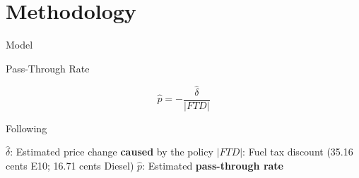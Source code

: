 \section{Methodology}






\begin{frame}{Model}


\vspace{-0.7cm}



\begin{block}{Pass-Through Rate}

\begin{equation}
\label{eq:Pass_Through_Rate}
\hat{p} = - \frac{\hat{\delta}}{|FTD|} 
\end{equation}

\begin{tiny}
Following \textcite{Frondel2024}    
\end{tiny}

\end{block}





\vspace{0.4cm}

\begin{outline}
    \1 $\hat{\delta}$: Estimated price change \textbf{caused} by the policy
    \1 $|FTD|$: Fuel tax discount (35.16 cents E10; 16.71 cents Diesel)
    \1 $\hat{p}$: Estimated \textbf{pass-through rate}
\end{outline}

\end{frame}






